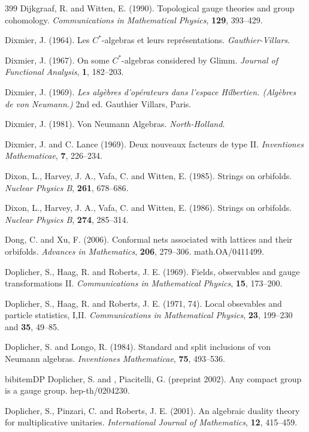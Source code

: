 \documentclass[12pt]{article}
\theoremstyle{plain}
\theoremstyle{definition}
\numberwithin{equation}{section}
\begin{document}
\begin{thebibliography} {399}
Dijkgraaf, R. and Witten, E. (1990).
Topological gauge theories and group cohomology.
{\em Communications in Mathematical Physics},  {\bf 129}, 393--429.

Dixmier, J. (1964).
Les $C^*$-algebras et leurs repr\'esentations.
{\em Gauthier-Villars}.

Dixmier, J. (1967).
On some $C^*$-algebras considered by Glimm.
{\em Journal of Functional Analysis}, {\bf 1}, 182--203.

Dixmier, J.  (1969).
{\em Les alg\`ebres d'op\'erateurs dans l'espace 
Hilbertien.   (Alg\`ebres de von Neumann.)}  2nd ed.
Gauthier Villars,  Paris.

Dixmier, J. (1981).
Von Neumann Algebras.
{\em North-Holland}.

Dixmier, J. and C. Lance (1969).
Deux nouveaux facteurs de type II.
{\em Inventiones Mathematicae},
{\bf 7}, 226--234.

Dixon, L., Harvey, J. A., Vafa, C. and Witten, E. 
(1985). Strings on orbifolds.
{\em Nuclear Physics B}, {\bf 261},
678--686.

Dixon, L., Harvey, J. A., Vafa, C. and Witten, E. (1986).
Strings on orbifolds.
{\em Nuclear Physics B}, {\bf 274}, 285--314.

Dong, C. and Xu, F. (2006).
Conformal nets associated with lattices and their orbifolds.
{\em Advances in Mathematics}, {\bf 206}, 279--306.
math.OA/0411499.

Doplicher, S., Haag, R. and Roberts, J. E. (1969).
Fields, observables and gauge transformations II.
{\em Communications in Mathematical Physics},
{\bf 15}, 173--200.

Doplicher, S., Haag, R. and Roberts, J. E. (1971, 74).
Local obsevables and particle statistics, I,II.
{\em Communications in Mathematical Physics},
{\bf 23}, 199--230 and {\bf 35}, 49--85.

Doplicher, S. and Longo, R. (1984).
Standard and split inclusions of von Neumann algebras.
{\em Inventiones Mathematicae}, {\bf 75}, 493--536.

bibitem{DP}
Doplicher, S. and , Piacitelli, G. (preprint 2002).
Any compact group is a gauge group.
hep-th/0204230.

Doplicher, S., Pinzari, C. and Roberts, J. E. (2001).
An algebraic duality theory for multiplicative unitaries. 
{\em International Journal of Mathematics}, {\bf 12}, 415--459.


\end{thebibliography}
\end{document}
